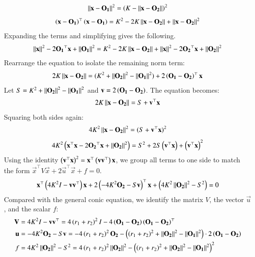 \documentclass[journal,12pt,onecolumn]{IEEEtran}
\theoremstyle{remark}
\begin{document}
\begin{align}
 \left\lVert\mathbf{x} - \mathbf{O_1}\right\rVert^2 = \left(K - \left\lVert\mathbf{x} - \mathbf{O_2}\right\rVert\right)^2
\end{align}
\begin{align}
 \left(\mathbf{x} - \mathbf{O_1}\right)^{\top}\left(\mathbf{x} - \mathbf{O_1}\right) = K^2 - 2K\left\lVert\mathbf{x} - \mathbf{O_2}\right\rVert + \left\lVert\mathbf{x} - \mathbf{O_2}\right\rVert^2
\end{align}
Expanding the terms and simplifying gives the following.
\begin{align}
 \left\lVert\mathbf{x}\right\rVert^2 - 2\mathbf{O_1}^{\top}\mathbf{x} + \left\lVert\mathbf{O_1}\right\rVert^2 = K^2 - 2K\left\lVert\mathbf{x} - \mathbf{O_2}\right\rVert + \left\lVert\mathbf{x}\right\rVert^2 - 2\mathbf{O_2}^{\top}\mathbf{x} + \left\lVert\mathbf{O_2}\right\rVert^2
\end{align}
Rearrange the equation to isolate the remaining norm term:
\begin{align}
 2K\left\lVert\mathbf{x} - \mathbf{O_2}\right\rVert = (K^2 + \left\lVert\mathbf{O_2}\right\rVert^2 - \left\lVert\mathbf{O_1}\right\rVert^2) + 2\left(\mathbf{O_1} - \mathbf{O_2}\right)^{\top}\mathbf{x}
\end{align}
Let $S = K^2 + \left\lVert\mathbf{O_2}\right\rVert^2 - \left\lVert\mathbf{O_1}\right\rVert^2$ and $\mathbf{v} = 2\left(\mathbf{O_1} - \mathbf{O_2}\right)$. The equation becomes:
\begin{align}
 2K\left\lVert\mathbf{x} - \mathbf{O_2}\right\rVert = S + \mathbf{v}^{\top}\mathbf{x}
\end{align}
Squaring both sides again:
\begin{align}
 4K^2\left\lVert\mathbf{x} - \mathbf{O_2}\right\rVert^2 = (S + \mathbf{v}^{\top}\mathbf{x})^2
\end{align}
\begin{align}
 4K^2\left(\mathbf{x}^{\top}\mathbf{x} - 2\mathbf{O_2}^{\top}\mathbf{x} + \left\lVert\mathbf{O_2}\right\rVert^2\right) = S^2 + 2S\left(\mathbf{v}^{\top}\mathbf{x}\right) + \left(\mathbf{v}^{\top}\mathbf{x}\right)^2
\end{align}
Using the identity $\left(\mathbf{v}^{\top}\mathbf{x}\right)^2 = \mathbf{x}^{\top}\left(\mathbf{v}\mathbf{v}^{\top}\right)\mathbf{x}$, we group all terms to one side to match the form $\vec{x}^{\top}V\vec{x} + 2\vec{u}^{\top}\vec{x} + f = 0$.
\begin{align}
 \mathbf{x}^{\top}\left(4K^2I - \mathbf{v}\mathbf{v}^{\top}\right)\mathbf{x} + 2\left(-4K^2\mathbf{O_2} - S\mathbf{v}\right)^{\top}\mathbf{x} + \left(4K^2\left\lVert\mathbf{O_2}\right\rVert^2 - S^2\right)= 0
\end{align}
Compared with the general conic equation, we identify the matrix $V$, the vector $\vec{u}$, and the scalar $f$:
\begin{align}
    \mathbf{V} &= 4K^2I - \mathbf{v}\mathbf{v}^{\top} = 4\left(r_1 + r_2\right)^2I - 4\left(\mathbf{O_1}-\mathbf{O_2}\right)\left(\mathbf{O_1}-\mathbf{O_2}\right)^{\top} \\
    \mathbf{u} &= -4K^2\mathbf{O_2} - S\mathbf{v} = -4\left(r_1 + r_2\right)^2\mathbf{O_2} - \left(\left(r_1 + r_2\right)^2 + \left\lVert\mathbf{O_2}\right\rVert^2 - \left\lVert\mathbf{O_1}\right\rVert^2 \right)\cdot 2\left(\mathbf{O_1}-\mathbf{O_2}\right) \\
    f &= 4K^2\left\lVert\mathbf{O_2}\right\rVert^2 - S^2 = 4\left(r_1 + r_2\right)^2\left\lVert\mathbf{O_2}\right\rVert^2 - \left(\left(r_1 + r_2\right)^2 + \left\lVert\mathbf{O_2}\right\rVert^2 - \left\lVert\mathbf{O_1}\right\rVert^2\right)^2
\end{align}
\end{document}
